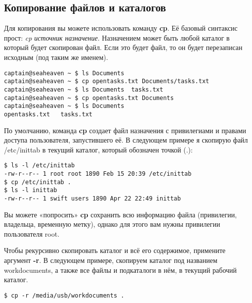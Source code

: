 \documentclass[12pt]{book}
\begin{document}
\subsection{Копирование файлов и каталогов}

Для копирования вы можете использовать команду \textbf{cp}. Её базовый синтаксис прост: \emph{cp источник назначение}. Назначением может быть любой каталог в который будет скопирован файл. Если это будет файл, то он будет перезаписан исходным (под таким же именем).

\vspace{3mm}
\begin{tcolorbox}
\begin{lstlisting}
captain@seaheaven ~ $ ls Documents
captain@seaheaven ~ $ cp opentasks.txt Documents/tasks.txt
captain@seaheaven ~ $ ls Documents 	tasks.txt
captain@seaheaven ~ $ cp opentasks.txt Documents
captain@seaheaven ~ $ ls Documents
opentasks.txt 	tasks.txt
\end{lstlisting}
\end{tcolorbox}

По умолчанию, команда \textbf{cp} создает файл назначения с привилегиами и правами доступа пользователя, запустившего её. В следующем примере я скопирую файл /etc/inittab в текущий каталог, который обозначен точкой (.):

\vspace{3mm}
\begin{tcolorbox}
\begin{lstlisting}
$ ls -l /etc/inittab
-rw-r--r-- 1 root root 1890 Feb 15 20:39 /etc/inittab
$ cp /etc/inittab .
$ ls -l inittab
-rw-r--r-- 1 swift users 1890 Apr 22 22:49 inittab
\end{lstlisting}
\end{tcolorbox}

Вы можете «попросить» \textbf{cp} сохранить всю информацию файла (привилегии, владельца, временную метку), однако для этого вам нужны привилегии пользователя root.

Чтобы рекурсивно скопировать каталог и всё его содержимое, примените аргумент \textbf{-r}. В следующем примере, скопируем каталог под названием workdocuments, а также все файлы и подкаталоги в нём, в текущий рабочий каталог.

\vspace{3mm}
\begin{tcolorbox}
\begin{lstlisting}
$ cp -r /media/usb/workdocuments .
\end{lstlisting}
\end{tcolorbox}
\end{document}
